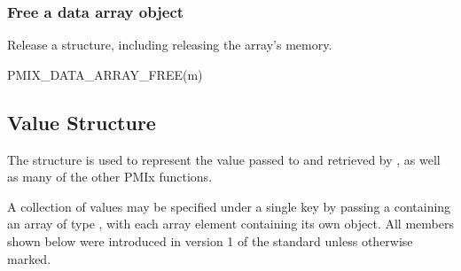 \begin{arglist}
\end{arglist}


\subsubsection{Free a data array object}

Release a  structure, including releasing the array's memory.

\cspecificstart
\begin{codepar}
PMIX_DATA_ARRAY_FREE(m)
\end{codepar}
\cspecificend

\begin{arglist}
\end{arglist}

\subsection{Value Structure}

The  structure is used to represent the value passed to  and retrieved by , as well as many of the other \ac{PMIx} functions.

A collection of values may be specified under a single key by passing a  containing an array of type , with each array element containing its own object. All members shown below were introduced in version 1 of the standard unless otherwise marked.

